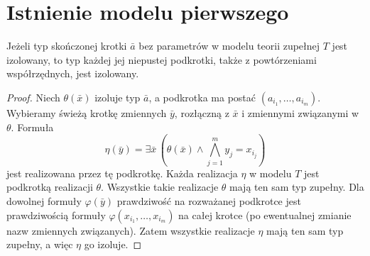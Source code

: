 \section{Istnienie modelu pierwszego}

\begin{lemat}
\label{lem:mod-isolated-subtuple}
Jeżeli typ skończonej krotki $\bar a$ bez parametrów
w modelu teorii zupełnej $T$ jest izolowany, to
typ każdej jej niepustej podkrotki, także z
powtórzeniami współrzędnych, jest izolowany.
\end{lemat}
\begin{proof}
Niech $\theta(\bar x)$ izoluje typ $\bar a$,
a podkrotka ma postać $(a_{i_1},\ldots,a_{i_m})$.
Wybieramy świeżą krotkę zmiennych $\bar y$,
rozłączną z $\bar x$ i zmiennymi związanymi w $\theta$.
Formuła
\[
\eta(\bar y)=\exists\bar x\,
\left(\theta(\bar x)\land
\bigwedge_{j=1}^m y_j=x_{i_j}\right)
\]
jest realizowana przez tę podkrotkę.
Każda realizacja $\eta$ w modelu $T$ jest
podkrotką realizacji $\theta$. Wszystkie takie
realizacje $\theta$ mają ten sam typ zupełny.
Dla dowolnej formuły $\varphi(\bar y)$
prawdziwość na rozważanej podkrotce jest
prawdziwością formuły
$\varphi(x_{i_1},\ldots,x_{i_m})$ na całej krotce
(po ewentualnej zmianie nazw zmiennych związanych).
Zatem wszystkie realizacje $\eta$ mają ten sam
typ zupełny, a więc $\eta$ go izoluje.
\end{proof}

